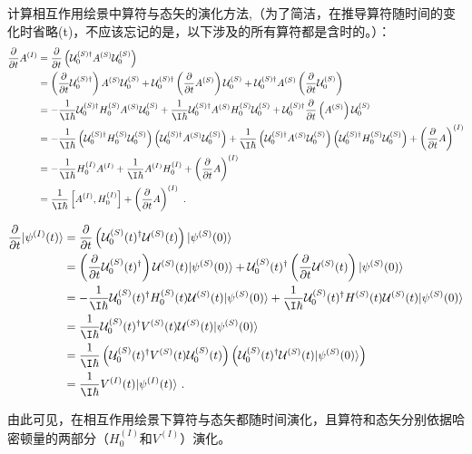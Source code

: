 计算相互作用绘景中算符与态矢的演化方法,（为了简洁，在推导算符随时间的变化时省略(t)，不应该忘记的是，以下涉及的所有算符都是含时的。）：
\begin{align}
\frac{\partial}{\partial t}A^{(I)}&=\frac{\partial}{\partial t}\left(\mathcal U^{(S)\dagger}_0 A^{(S)}\mathcal U^{(S)}_0 \right)\\
&=\left(\frac{\partial}{\partial t}\mathcal U^{(S)\dagger}_0\right) A^{(S)}\mathcal U^{(S)}_0 +\mathcal U^{(S)\dagger}_0 \left(\frac{\partial}{\partial t}A^{(S)}\right)\mathcal U^{(S)}_0+\mathcal U^{(S)\dagger}_0 A^{(S)}\left(\frac{\partial}{\partial t}\mathcal U^{(S)}_0\right)\\
&=-\frac{1}{\I\hbar}\mathcal U^{(S)\dagger}_0 H^{(S)}_0A^{(S)}\mathcal U^{(S)}_0 +\frac{1}{\I\hbar}\mathcal U^{(S)\dagger}_0 A^{(S)}H^{(S)}_0\mathcal U^{(S)}_0+\mathcal U^{(S)\dagger}_0 \frac{\partial}{\partial t}\left(A^{(S)}\right)\mathcal U^{(S)}_0 \\
&=-\frac{1}{\I\hbar}\left(\mathcal U^{(S)\dagger}_0 H^{(S)}_0 \mathcal U^{(S)}_0\right)\left(\mathcal U^{(S)\dagger}_0 A^{(S)}\mathcal U^{(S)}_0\right) +\frac{1}{\I\hbar}\left(\mathcal U^{(S)\dagger}_0 A^{(S)}\mathcal U^{(S)}_0\right)\left(\mathcal U^{(S)\dagger}_0 H^{(S)}_0\mathcal U^{(S)}_0\right)+\left(\frac{\partial}{\partial t}A\right)^{(I)} \\
&=-\frac{1}{\I\hbar} H^{(I)}_0  A^{(I)}+\frac{1}{\I\hbar} A^{(I)} H^{(I)}_0+\left(\frac{\partial}{\partial t}A\right)^{(I)} \\
&=\frac{1}{\I\hbar}\left[A^{(I)},H_0^{(I)}\right]+\left(\frac{\partial}{\partial t}A\right)^{(I)}~.
\end{align}

\begin{align}
\frac{\partial}{\partial t}|\psi^{(I)}(t)\rangle&=
\frac{\partial}{\partial t}\left(\mathcal U^{(S)}_0(t)^\dagger\mathcal U^{(S)}(t)\right)|\psi^{(S)}(0)\rangle \\
&=\left(\frac{\partial}{\partial t}\mathcal U^{(S)}_0(t)^\dagger\right)\mathcal U^{(S)}(t)|\psi^{(S)}(0)\rangle+\mathcal U^{(S)}_0(t)^\dagger\left(\frac{\partial}{\partial t}\mathcal U^{(S)}(t)\right)|\psi^{(S)}(0)\rangle \\
&=-\frac{1}{\I\hbar}\mathcal U^{(S)}_0(t)^\dagger H^{(S)}_0(t)\mathcal U^{(S)}(t)|\psi^{(S)}(0)\rangle+\frac{1}{\I\hbar}\mathcal U^{(S)}_0(t)^\dagger H^{(S)}(t)\mathcal U^{(S)}(t) |\psi^{(S)}(0)\rangle \\
&=\frac{1}{\I\hbar}\mathcal U^{(S)}_0(t)^\dagger V^{(S)}(t)\mathcal U^{(S)}(t) |\psi^{(S)}(0)\rangle \\
&=\frac{1}{\I\hbar}\left(\mathcal U^{(S)}_0(t)^\dagger V^{(S)}(t)\mathcal U^{(S)}_0(t)\right)\left(\mathcal U^{(S)}_0(t)^\dagger\mathcal U^{(S)}(t) |\psi^{(S)}(0)\rangle\right) \\
&=\frac{1}{\I\hbar}V^{(I)}(t)|\psi^{(I)}(t)\rangle~.
\end{align}

由此可见，在相互作用绘景下算符与态矢都随时间演化，且算符和态矢分别依据哈密顿量的两部分（$H_0^{(I)}$和$V^{(I)}$）演化。



